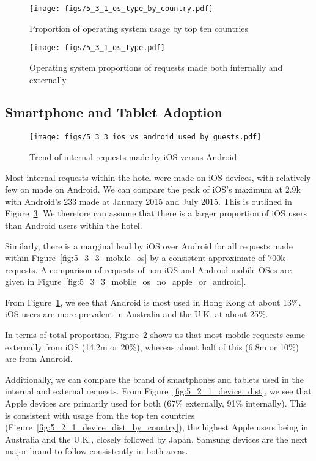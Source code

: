 \documentclass[12pt,titlepage]{article}
\begin{document}
\begin{figure}[thbp]
  \centering
  \texttt{[image: figs/5\_3\_1\_os\_type\_by\_country.pdf]}
  \caption{Proportion of operating system usage by top ten countries}
  \label{fig:5_3_1_os_type_by_country}
\end{figure}

\begin{figure}[thbp]
  \hspace{-0.1\textwidth}
  \texttt{[image: figs/5\_3\_1\_os\_type.pdf]}
  \caption{Operating system proportions of requests made both internally and externally}
  \label{fig:5_3_os_type}
\end{figure}

\subsection{Smartphone and Tablet Adoption}
\label{ssub:smartphone_adoption}
\begin{figure}[thbp]
  \centering
  \texttt{[image: figs/5\_3\_3\_ios\_vs\_android\_used\_by\_guests.pdf]}
  \caption{Trend of internal requests made by iOS versus Android}
  \label{fig:5_3_3_ios_vs_android_used_by_guests}
\end{figure}

Most internal requests within the hotel were made on iOS devices, with relatively few on made on Android. We can compare the peak of iOS's maximum at 2.9k with Android's 233 made at January 2015 and July 2015. This is outlined in Figure~\ref{fig:5_3_3_ios_vs_android_used_by_guests}. We therefore can assume that there is a larger proportion of iOS users than Android users within the hotel.

Similarly, there is a marginal lead by iOS over Android for all requests made within Figure~\ref{fig:5_3_3_mobile_os} by a consistent approximate of 700k requests. A comparison of requests of non-iOS and Android mobile OSes are given in Figure~\ref{fig:5_3_3_mobile_os_no_apple_or_android}.

From Figure~\ref{fig:5_3_1_os_type_by_country}, we see that Android is most used in Hong Kong at about 13\%. iOS users are more prevalent in Australia and the U.K. at about 25\%.

In terms of total proportion, Figure~\ref{fig:5_3_os_type} shows us that most mobile-requests came externally from iOS (14.2m or 20\%), whereas about half of this (6.8m or 10\%) are from Android.

Additionally, we can compare the brand of smartphones and tablets used in the internal and external requests. From Figure~\ref{fig:5_2_1_device_dist}, we see that Apple devices are primarily used for both (67\% externally, 91\% internally). This is consistent with usage from the top ten countries (Figure~\ref{fig:5_2_1_device_dist_by_country}), the highest Apple users being in Australia and the U.K., closely followed by Japan. Samsung devices are the next major brand to follow consistently in both areas.
\end{document}
